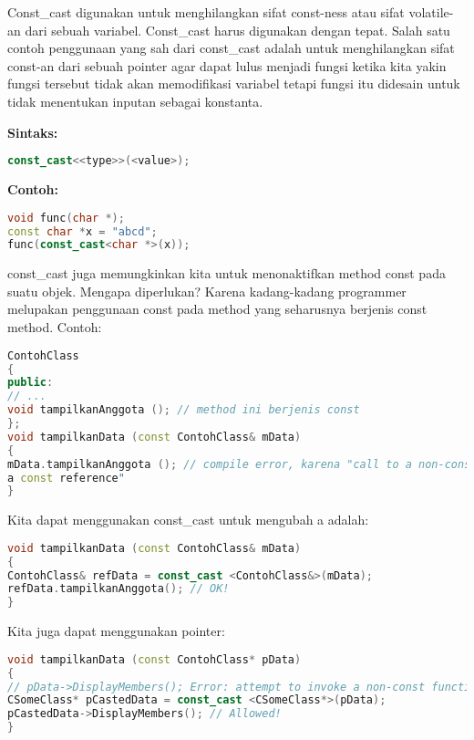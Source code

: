 Const\_cast digunakan untuk menghilangkan sifat const-ness atau sifat
volatile-an dari sebuah variabel. Const\_cast harus digunakan dengan
tepat. Salah satu contoh penggunaan yang sah dari const\_cast adalah
untuk menghilangkan sifat const-an dari sebuah pointer agar dapat lulus
menjadi fungsi ketika kita yakin fungsi tersebut tidak akan memodifikasi
variabel tetapi fungsi itu didesain untuk tidak menentukan inputan
sebagai konstanta.

\textbf{Sintaks:}

\begin{lstlisting}[language=c++, numbers=none]
const_cast<<type>>(<value>);
\end{lstlisting}

\textbf{Contoh:}

\begin{lstlisting}[language=c++, numbers=none]
void func(char *);
const char *x = "abcd";
func(const_cast<char *>(x));
\end{lstlisting}

const\_cast juga memungkinkan kita untuk menonaktifkan method const pada
suatu objek. Mengapa diperlukan? Karena kadang-kadang programmer
melupakan penggunaan const pada method yang seharusnya berjenis const
method. Contoh:

\begin{lstlisting}[language=c++, numbers=none]
ContohClass
{
public:
// ...
void tampilkanAnggota (); // method ini berjenis const
};
void tampilkanData (const ContohClass& mData)
{
mData.tampilkanAnggota (); // compile error, karena "call to a non-const member using
a const reference"
}
\end{lstlisting}

Kita dapat menggunakan const\_cast untuk mengubah a adalah:

\begin{lstlisting}[language=c++, numbers=none]
void tampilkanData (const ContohClass& mData)
{
ContohClass& refData = const_cast <ContohClass&>(mData);
refData.tampilkanAnggota(); // OK!
}
\end{lstlisting}

Kita juga dapat menggunakan pointer:

\begin{lstlisting}[language=c++, numbers=none]
void tampilkanData (const ContohClass* pData)
{
// pData->DisplayMembers(); Error: attempt to invoke a non-const function!
CSomeClass* pCastedData = const_cast <CSomeClass*>(pData);
pCastedData->DisplayMembers(); // Allowed!
}
\end{lstlisting}


